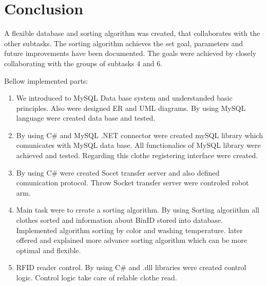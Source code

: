 \section{Conclusion}

A flexible database and sorting algorithm was created, that collaborates with the other subtasks. The sorting algorithm achieves the set goal, parameters and future improvements have been documented. The goals were achieved by closely collaborating with the groups of subtasks 4 and 6. 

Bellow implemented parts:
\begin{enumerate}
	\item We introduced to MySQL Data base system and understanded basic principles. Also were designed ER and UML diagrams. By using MySQL language were created data base and tested.
	\item By using C\# and MySQL .NET connector were created mySQL library which comunicates with MySQL data base. All functionalies of MySQL library were achieved and tested. Regarding this clothe registering interface were created.
	\item By using C\# were created Socet transfer server and also defined comunication protocol. Throw Socket transfer server were controled robot arm.
	\item Main task were to create a sorting algorithm. By using Sorting algoriithm all clothes sorted and information about BinID stored into database. Implemented algorithm sorting by color and washing temperature. later offered and explained more advance sorting algorithm which can be more optimal and flexible.
	\item RFID reader control. By using C\# and .dll libraries were created control logic. Control logic take care of relable clothe read.
\end{enumerate}